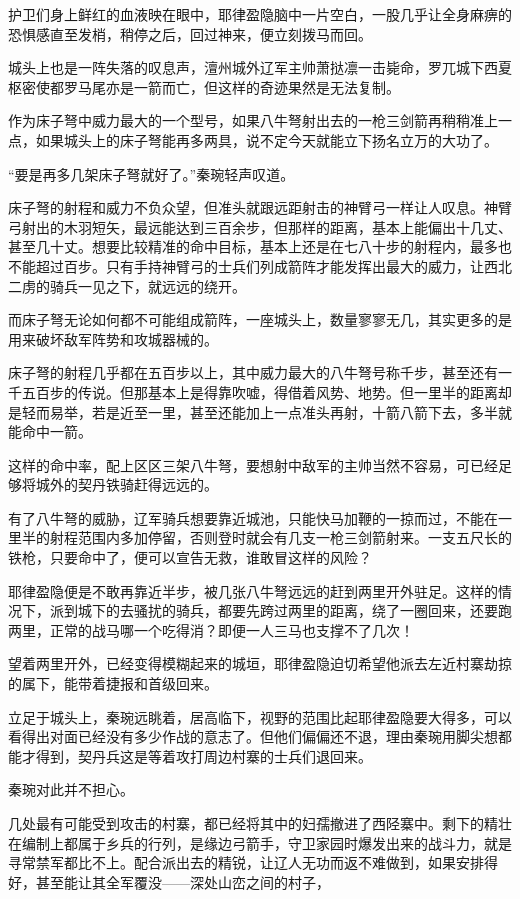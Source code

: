 护卫们身上鲜红的血液映在眼中，耶律盈隐脑中一片空白，一股几乎让全身麻痹的恐惧感直至发梢，稍停之后，回过神来，便立刻拨马而回。

城头上也是一阵失落的叹息声，澶州城外辽军主帅萧挞凛一击毙命，罗兀城下西夏枢密使都罗马尾亦是一箭而亡，但这样的奇迹果然是无法复制。

作为床子弩中威力最大的一个型号，如果八牛弩射出去的一枪三剑箭再稍稍准上一点，如果城头上的床子弩能再多两具，说不定今天就能立下扬名立万的大功了。

“要是再多几架床子弩就好了。”秦琬轻声叹道。

床子弩的射程和威力不负众望，但准头就跟远距射击的神臂弓一样让人叹息。神臂弓射出的木羽短矢，最远能达到三百余步，但那样的距离，基本上能偏出十几丈、甚至几十丈。想要比较精准的命中目标，基本上还是在七八十步的射程内，最多也不能超过百步。只有手持神臂弓的士兵们列成箭阵才能发挥出最大的威力，让西北二虏的骑兵一见之下，就远远的绕开。

而床子弩无论如何都不可能组成箭阵，一座城头上，数量寥寥无几，其实更多的是用来破坏敌军阵势和攻城器械的。

床子弩的射程几乎都在五百步以上，其中威力最大的八牛弩号称千步，甚至还有一千五百步的传说。但那基本上是得靠吹嘘，得借着风势、地势。但一里半的距离却是轻而易举，若是近至一里，甚至还能加上一点准头再射，十箭八箭下去，多半就能命中一箭。

这样的命中率，配上区区三架八牛弩，要想射中敌军的主帅当然不容易，可已经足够将城外的契丹铁骑赶得远远的。

有了八牛弩的威胁，辽军骑兵想要靠近城池，只能快马加鞭的一掠而过，不能在一里半的射程范围内多加停留，否则登时就会有几支一枪三剑箭射来。一支五尺长的铁枪，只要命中了，便可以宣告无救，谁敢冒这样的风险？

耶律盈隐便是不敢再靠近半步，被几张八牛弩远远的赶到两里开外驻足。这样的情况下，派到城下的去骚扰的骑兵，都要先跨过两里的距离，绕了一圈回来，还要跑两里，正常的战马哪一个吃得消？即便一人三马也支撑不了几次！

望着两里开外，已经变得模糊起来的城垣，耶律盈隐迫切希望他派去左近村寨劫掠的属下，能带着捷报和首级回来。

立足于城头上，秦琬远眺着，居高临下，视野的范围比起耶律盈隐要大得多，可以看得出对面已经没有多少作战的意志了。但他们偏偏还不退，理由秦琬用脚尖想都能才得到，契丹兵这是等着攻打周边村寨的士兵们退回来。

秦琬对此并不担心。

几处最有可能受到攻击的村寨，都已经将其中的妇孺撤进了西陉寨中。剩下的精壮在编制上都属于乡兵的行列，是缘边弓箭手，守卫家园时爆发出来的战斗力，就是寻常禁军都比不上。配合派出去的精锐，让辽人无功而返不难做到，如果安排得好，甚至能让其全军覆没——深处山峦之间的村子，

